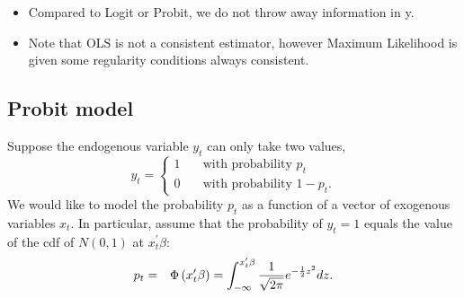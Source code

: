 \documentclass{article}
\begin{document}
\begin{solution}
\begin{itemize}
  \item Compared to Logit or Probit, we do not throw away information in y.
  \item Note that OLS is not a consistent estimator, however Maximum Likelihood is given some regularity conditions always consistent.

\end{itemize}
\end{solution}

\subsection{Probit model\label{mlprobit}}

Suppose the endogenous variable $y_{t}$ can only take two values,%
\begin{equation*}
y_{t}=\left\{
\begin{array}{ll}
1 & \quad \text{with probability }p_{t} \\
0 & \quad \text{with probability }1-p_{t}.%
\end{array}%
\right.
\end{equation*}%
We would like to model the probability $p_{t}$ as a function of a vector of
exogenous variables $x_{t}$. In particular, assume that the probability
of $y_{t}=1$ equals the value of the cdf of $N(0,1)$ at $x_{t}^{\prime
}\beta $:%
\begin{eqnarray*}
p_{t} &=&\Phi \left( x_{t}^{\prime }\beta \right)
=\int_{-\infty }^{x_{t}^{\prime }\beta }\frac{1}{\sqrt{2\pi }}e^{-\frac{1}{%
2}z^{2}}dz.
\end{eqnarray*}
\end{document}
